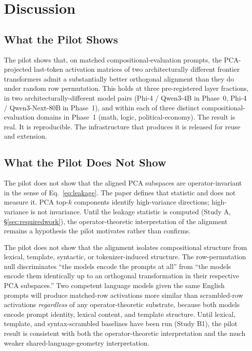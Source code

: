 \section{Discussion}
\label{sec:discussion}

\subsection{What the Pilot Shows}

The pilot shows that, on matched compositional-evaluation prompts, the
PCA-projected last-token activation matrices of two architecturally
different frontier transformers admit a substantially better
orthogonal alignment than they do under random row permutation. This
holds at three pre-registered layer fractions, in two
architecturally-different model pairs (Phi-4 / Qwen3-4B in Phase~0,
Phi-4 / Qwen3-Next-80B in Phase~1), and within each of three distinct
compositional-evaluation domains in Phase~1 (math, logic,
political-economy). The result is real. It is reproducible. The
infrastructure that produces it is released for reuse and extension.

\subsection{What the Pilot Does Not Show}

The pilot does not show that the aligned PCA subspaces are
operator-invariant in the sense of Eq.~\eqref{eq:leakage}. The paper
defines that statistic and does not measure it. PCA top-$k$ components
identify high-variance directions; high-variance is not invariance.
Until the leakage statistic is computed (Study A,
\S\ref{sec:requiredwork}), the operator-theoretic interpretation of
the alignment remains a hypothesis the pilot motivates rather than
confirms.

The pilot does not show that the alignment isolates compositional
structure from lexical, template, syntactic, or tokenizer-induced
structure. The row-permutation null discriminates ``the models encode
the prompts at all'' from ``the models encode them identically up to
an orthogonal transformation in their respective PCA subspaces.'' Two
competent language models given the same English prompts will produce
matched-row activations more similar than scrambled-row activations
\emph{regardless} of any operator-theoretic substrate, because both
models encode prompt identity, lexical content, and template
structure. Until lexical, template, and syntax-scrambled baselines
have been run (Study B1), the pilot result is consistent with both the
operator-theoretic interpretation and the much weaker
shared-language-geometry interpretation.

